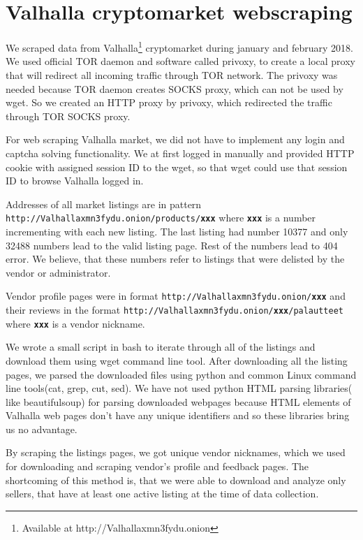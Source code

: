 \documentclass[
  digital, %
  table,   %
  lof,     %
  lot,     %
  oneside
]{fithesis3}
\begin{document}
\section{Valhalla cryptomarket webscraping}
We scraped data from Valhalla\footnote{Available at http://Valhallaxmn3fydu.onion} cryptomarket
during january and february 2018. 
We used official TOR daemon and software called privoxy, to create a local proxy that will redirect all
incoming traffic through TOR network. The privoxy was needed because TOR daemon creates SOCKS proxy,
which can not be used by wget. So we created an HTTP proxy by privoxy,
which redirected the traffic through TOR SOCKS proxy.

For web scraping Valhalla market,
we did not have to implement any login and captcha solving functionality.
We at first logged in manually and provided HTTP cookie with assigned session ID to the wget,
so that wget could use that session ID to browse Valhalla logged in.

Addresses of all market listings are in pattern\newline
\texttt{http://Valhallaxmn3fydu.onion/products/\textbf{xxx}} where \texttt{\textbf{xxx}}
is a number incrementing with each new listing.
The last listing had number 10377 and only 32488 numbers lead to the valid listing page.
Rest of the numbers lead to 404 error. We believe,
that these numbers refer to listings that were delisted by the vendor or administrator.

Vendor profile pages were in format \texttt{http://Valhallaxmn3fydu.onion/\textbf{xxx}}
and their reviews in the format
 \texttt{http://Valhallaxmn3fydu.onion/\textbf{xxx}/palautteet} where \texttt{\textbf{xxx}}
is a vendor nickname. 
 
We wrote a small script in bash to iterate through all of the listings
and download them using wget command line tool.
After downloading all the listing pages,
we parsed the downloaded files using python and common Linux command line tools(cat, grep, cut, sed).
We have not used python HTML parsing libraries( like beautifulsoup) for parsing downloaded
webpages because HTML elements of Valhalla web pages don't have any unique identifiers
and so these libraries bring us no advantage.
 
By scraping the listings pages, we got unique vendor nicknames,
which we used for downloading and scraping vendor's profile and feedback pages. 
The shortcoming of this method is, that we were able to download and analyze only sellers, 
that have at least one active listing at the time of data collection. 
\end{document}
